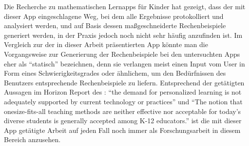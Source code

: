 Die Recherche zu mathematischen Lernapps für Kinder hat gezeigt, dass der mit dieser App
eingeschlagene Weg, bei dem alle Ergebnisse protokolliert und analysiert werden, und auf Basis dessen
maßgeschneiderte Rechenbeispiele generiert werden, in der Praxis jedoch noch nicht sehr häufig anzufinden 
ist. Im Vergleich zur der in dieser Arbeit präsentierten App könnte man die Vorgangsweise zur 
Generierung der Rechenbeispiele bei den untersuchten Apps eher als \enquote{statisch} bezeichnen, 
denn sie verlangen meist einen Input vom User in Form eines Schwierigkeitsgrades oder ähnlichem, 
um den Bedürfnissen des Benutzers entsprechende Rechenbeispiele zu liefern. 
Entsprechend der getätigten Aussagen im Horizon Report des \citet{NMC2013} : \enquote{the demand for
personalized learning is not adequately supported by current technology or practices} und 
\enquote{The notion that onesize-fits-all teaching methods are neither effective nor acceptable for 
today’s diverse students is generally accepted among K-12 educators.} ist die mit 
dieser App getätigte Arbeit auf jeden Fall noch immer als Forschungsarbeit in diesem Bereich anzusehen.


